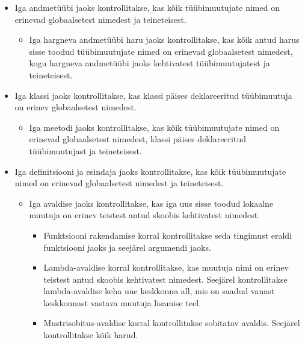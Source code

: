 \documentclass[12pt]{article}
\begin{document}
      \begin{itemize}
        \item
          Iga andmetüübi jaoks kontrollitakse, kas kõik tüübimuutujate nimed on erinevad globaalsetest nimedest ja teineteisest.

          \begin{itemize}
            \item
              Iga hargneva andmetüübi haru jaoks kontrollitakse, kas kõik antud harus sisse toodud tüübimuutujate nimed on erinevad globaalsetest nimedest, kogu hargneva andmetüübi jaoks kehtivatest tüübimuutujatest ja teineteisest.
          \end{itemize}
        \item
          Iga klassi jaoks kontrollitakse, kas klassi päises deklareeritud tüübimuutuja on erinev globaalsetest nimedest.

          \begin{itemize}
            \item
              Iga meetodi jaoks kontrollitakse, kas kõik tüübimuutujate nimed on erinevad globaalsetest nimedest, klassi päises deklareeritud tüübimuutujast ja teineteisest.
          \end{itemize}
        \item
          Iga definitsiooni ja esindaja jaoks kontrollitakse, kas kõik tüübimuutujate nimed on erinevad globaalsetest nimedest ja teineteisest.

          \begin{itemize}
            \item
              Iga avaldise jaoks kontrollitakse, kas iga uus sisse toodud lokaalne muutuja on erinev teistest antud skoobis kehtivatest nimedest.

              \begin{itemize}
                \item
                  Funktsiooni rakendamise korral kontrollitakse seda tingimust eraldi funktsiooni jaoks ja seejärel argumendi jaoks.
                \item
                  Lambda-avaldise korral kontrollitakse, kas muutuja nimi on erinev teistest antud skoobis kehtivatest nimedest. Seejärel kontrollitakse lambda-avaldise keha uue keskkonna all, mis on saadud vanast keskkonnast vastava muutuja lisamise teel.
                \item
                  Mustrisobitus-avaldise korral kontrollitakse sobitatav avaldis. Seejärel kontrollitakse kõik harud.


\end{itemize}
\end{itemize}
\end{itemize}
\end{document}
